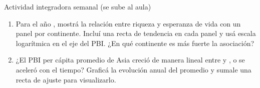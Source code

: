 \documentclass[8pt]{beamer}
\begin{document}
	\begin{frame}[fragile]{Actividad integradora semanal (se sube al aula)}
		\begin{enumerate}[start = 4]
			\item Para el año , mostrá la relación entre riqueza y esperanza de vida con un panel por continente. Incluí una recta de tendencia en cada panel y usá escala logarítmica en el eje del PBI. ¿En qué continente es más fuerte la asociación?

			\item ¿El PBI per cápita promedio de Asia creció de manera lineal entre  y , o se aceleró con el tiempo? Graficá la evolución anual del promedio y sumale una recta de ajuste para visualizarlo.
		\end{enumerate}
	\end{frame}
\end{document}
